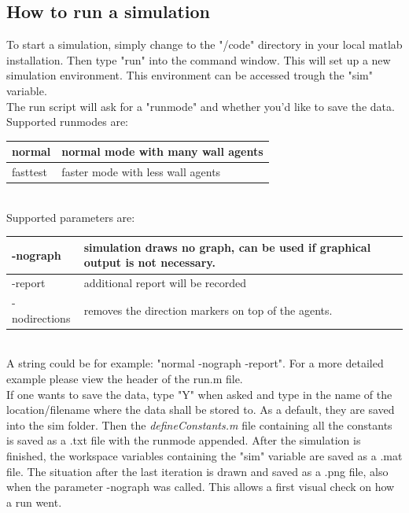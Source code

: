 \subsection{How to run a simulation}
To start a simulation, simply change to the "/code" directory in your local matlab installation. Then type "run" into the command window. This will set up a new simulation environment. This environment can be accessed trough the "sim" variable.\\
The run script will ask for a "runmode" and whether you'd like to save the data. Supported runmodes are:\\
\begin{tabular}{|p{3cm}|p{10cm}|}
      \hline
      normal & normal mode with many wall agents\\ \hline
      fasttest & faster mode with less wall agents \\ 
      \hline
\end{tabular}\\
\noi Supported parameters are:\\
\begin{tabular}{|p{3cm}|p{10cm}|}
      \hline
      -nograph & simulation draws no graph, can be used if graphical output is not necessary.\\ \hline
      -report & additional report will be recorded\\ \hline
      -nodirections & removes the direction markers on top of the agents.\\
      \hline
\end{tabular}\\
\noi A string could be for example: "normal -nograph -report". For a more detailed example please view the header of the run.m file. \\
\noi If one wants to save the data, type "Y" when asked and type in the name of the location/filename where the data shall be stored to. As a default, they are saved into the sim folder. Then the \textit{defineConstants.m} file containing all the constants is saved as a .txt file with the runmode appended. After the simulation is finished, the workspace variables containing the "sim" variable are saved as a .mat file. The situation after the last iteration is drawn and saved as a .png file, also when the parameter -nograph was called. This allows a first visual check on how a run went.
